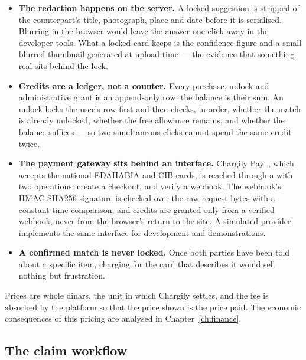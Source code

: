 \begin{itemize}[leftmargin=1.4em,itemsep=3pt]
  \item \textbf{The redaction happens on the server.} A locked suggestion is
        stripped of the counterpart's title, photograph, place and date before
        it is serialised. Blurring in the browser would leave the answer one
        click away in the developer tools. What a locked card keeps is the
        confidence figure and a small blurred thumbnail generated at upload
        time --- the evidence that something real sits behind the lock.
  \item \textbf{Credits are a ledger, not a counter.} Every purchase, unlock and
        administrative grant is an append-only row; the balance is their sum.
        An unlock locks the user's row first and then checks, in order, whether
        the match is already unlocked, whether the free allowance remains, and
        whether the balance suffices --- so two simultaneous clicks cannot spend
        the same credit twice.
  \item \textbf{The payment gateway sits behind an interface.} Chargily
        Pay~\cite{chargily2026}, which accepts the national EDAHABIA and CIB
        cards, is reached through a  with two operations:
        create a checkout, and verify a webhook. The webhook's HMAC-SHA256
        signature is checked over the raw request bytes with a constant-time
        comparison, and credits are granted only from a verified webhook, never
        from the browser's return to the site. A simulated provider implements
        the same interface for development and demonstrations.
  \item \textbf{A confirmed match is never locked.} Once both parties have been
        told about a specific item, charging for the card that describes it
        would sell nothing but frustration.
\end{itemize}

Prices are whole dinars, the unit in which Chargily settles, and the fee is
absorbed by the platform so that the price shown is the price paid. The economic
consequences of this pricing are analysed in Chapter~\ref{ch:finance}.


\subsection{The claim workflow}

